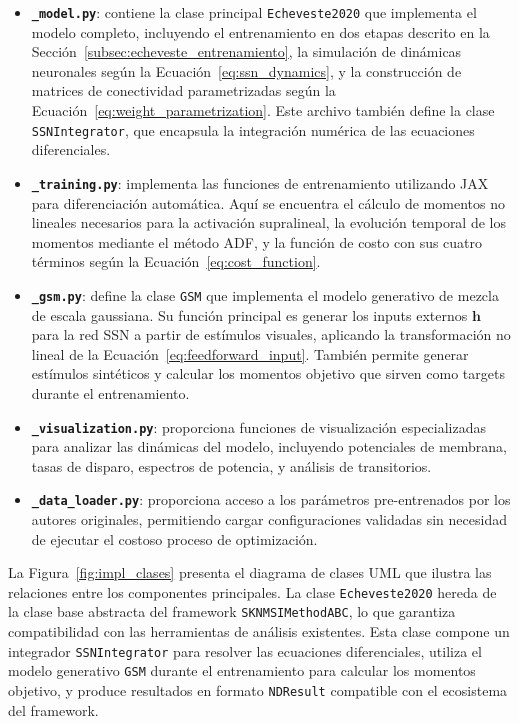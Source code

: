 \begin{itemize}
    \item \textbf{\texttt{\_model.py}}: contiene la clase principal \texttt{Echeveste2020} que implementa el modelo completo, incluyendo el entrenamiento en dos etapas descrito en la Sección~\ref{subsec:echeveste_entrenamiento}, la simulación de dinámicas neuronales según la Ecuación~\ref{eq:ssn_dynamics}, y la construcción de matrices de conectividad parametrizadas según la Ecuación~\ref{eq:weight_parametrization}. Este archivo también define la clase \texttt{SSNIntegrator}, que encapsula la integración numérica de las ecuaciones diferenciales.

    \item \textbf{\texttt{\_training.py}}: implementa las funciones de entrenamiento utilizando JAX para diferenciación automática. Aquí se encuentra el cálculo de momentos no lineales necesarios para la activación supralineal, la evolución temporal de los momentos mediante el método \acrshort{ADF}, y la función de costo con sus cuatro términos según la Ecuación~\ref{eq:cost_function}.

    \item \textbf{\texttt{\_gsm.py}}: define la clase \texttt{GSM} que implementa el modelo generativo de mezcla de escala gaussiana. Su función principal es generar los inputs externos $\mathbf{h}$ para la red SSN a partir de estímulos visuales, aplicando la transformación no lineal de la Ecuación~\ref{eq:feedforward_input}. También permite generar estímulos sintéticos y calcular los momentos objetivo que sirven como targets durante el entrenamiento.

    \item \textbf{\texttt{\_visualization.py}}: proporciona funciones de visualización especializadas para analizar las dinámicas del modelo, incluyendo potenciales de membrana, tasas de disparo, espectros de potencia, y análisis de transitorios.

    \item \textbf{\texttt{\_data\_loader.py}}: proporciona acceso a los parámetros pre-entrenados por los autores originales, permitiendo cargar configuraciones validadas sin necesidad de ejecutar el costoso proceso de optimización.
\end{itemize}

La Figura~\ref{fig:impl_clases} presenta el diagrama de clases UML que ilustra las relaciones entre los componentes principales. La clase \texttt{Echeveste2020} hereda de la clase base abstracta del framework \texttt{SKNMSIMethodABC}, lo que garantiza compatibilidad con las herramientas de análisis existentes. Esta clase compone un integrador \texttt{SSNIntegrator} para resolver las ecuaciones diferenciales, utiliza el modelo generativo \texttt{GSM} durante el entrenamiento para calcular los momentos objetivo, y produce resultados en formato \texttt{NDResult} compatible con el ecosistema del framework.

